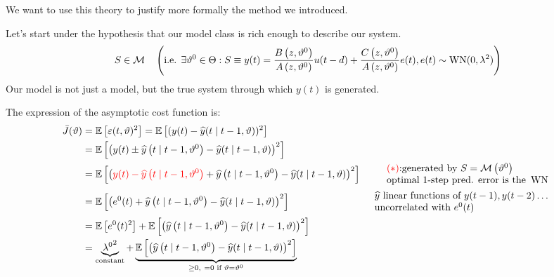 We want to use this theory to justify more formally the method we introduced.

Let's start under the hypothesis that our model class is rich enough to describe our system.
\begin{equation*}
S\in \mathcal{M} \quad \left(\text{i.e. }\exists \vartheta ^{0} \in \Theta :S\equiv y(t) =\frac{B\left(z,\vartheta ^{0}\right)}{A\left(z,\vartheta ^{0}\right)} u(t-d) +\frac{C\left(z,\vartheta ^{0}\right)}{A\left(z,\vartheta ^{0}\right)} e(t) ,e(t) \sim \operatorname{WN}(0,\lambda ^{2})\right)
\end{equation*}
Our model is not just a model, but the true system through which $ y(t)$ is generated.

The expression of the asymptotic cost function is:
\begin{equation*}
\begin{aligned}
\bar{J}(\theta) & =\E\left[ \varepsilon (t,\theta)^{2}\right] =\E\left[(y(t) -\hat{y}(t\mid t-1,\theta))^{2}\right] & \\
 & =\E\left[\left(y(t) \pm \hat{y}\left(t\mid t-1,\theta ^{0}\right) -\hat{y}(t\mid t-1,\theta)\right)^{2}\right] & \\
 & =\E\left[\left(\textcolor[rgb]{1,0,0}{y(t) -\hat{y}\left(t\mid t-1,\theta^{0}\right)} +\hat{y}\left(t\mid t-1,\theta ^{0}\right) -\hat{y}(t\mid t-1,\theta)\right)^{2}\right] &  \begin{array}{l}
\textcolor[rgb]{1,0,0}{(*)}\text{:generated by } S=\Mc\left(\theta ^{0}\right)\\
\text{optimal 1-step pred. error is the } \WN
\end{array}\\
 & =\E\left[\left(e^{0}(t) +\hat{y}\left(t\mid t-1,\theta ^{0}\right) -\hat{y}(t\mid t-1,\theta)\right)^{2}\right] &  \begin{array}{l}
\hat{y} \text{ linear functions of } y(t-1),y(t-2) \ldots\\
\text{uncorrelated with } e^{0}(t)
\end{array}\\
 & =\E\left[ e^{0}(t)^{2}\right] +\E\left[\left(\hat{y}\left(t\mid t-1,\theta ^{0}\right) -\hat{y}(t\mid t-1,\theta)\right)^{2}\right] & \\
 & =\underbrace{\lambda {^{0}}^{2}}_{\text{constant}} +\underbrace{\E\left[\left(\hat{y}\left(t\mid t-1,\theta ^{0}\right) -\hat{y}(t\mid t-1,\theta)\right)^{2}\right]}_{\geq 0,\ =0\text{ if } \theta =\theta ^{0}} & 
\end{aligned}
\end{equation*}

